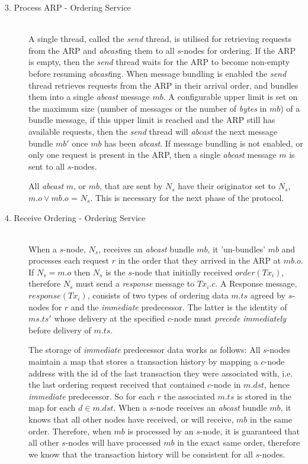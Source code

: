 \begin{description}
		\item[3. Process ARP - Ordering Service] \hfill \\
		A single thread, called the \emph{send} thread, is utilised for retrieving requests from the ARP and \emph{abcast}ing them to all $s$-nodes for ordering.  If the ARP is empty, then the \emph{send} thread waits for the ARP to become non-empty before resuming \emph{abcast}ing.  When message bundling is enabled the \emph{send} thread retrieves requests from the ARP in their arrival order, and bundles them into a single \emph{abcast} message $mb$.  A configurable upper limit is set on the maximum size (number of messages or the number of \emph{bytes} in $mb$) of a bundle message, if this upper limit is reached and the ARP still has available requests, then the \emph{send} thread will \emph{abcast} the next message bundle $mb'$ once $mb$ has been \emph{abcast}.  If message bundling is not enabled, or only one request is present in the ARP, then a single \emph{abcast} message $m$ is sent to all $s$-nodes.  
		
		All \emph{abcast} $m$, or $mb$, that are sent by  $N_s$ have their originator set to $N_s$, $m.o \lor mb.o$ = $N_s$.  This is necessary for the next phase of the protocol.  
		
		\item[4. Receive Ordering - Ordering Service] \hfill \\
		When a $s$-node, $N_s$, receives an \emph{abcast} bundle $mb$, it 'un-bundles' $mb$ and processes each request $r$ in the order that they arrived in the ARP at $mb.o$.  If $N_s = m.o$ then $N_s$ is the $s$-node that initially received $order(Tx_i)$, therefore $N_s$ must send a \emph{response} message to $Tx_i.c$.   A Response message, $response(Tx_i)$, consists of two types of ordering data $m.ts$ agreed by $s$-nodes for $r$ and the \emph{immediate} predecessor.  The latter is the identity of $ms.ts'$ whose delivery at the specified $c$-node must \emph{precede} \emph{immediately} before delivery of $m.ts$.  
		
		The storage of \emph{immediate} predecessor data works as follows: All $s$-nodes maintain a map that stores a transaction history by mapping a $c$-node address with the id of the last transaction they were associated with, i.e. the last ordering request received that contained $c$-node in $m.dst$, hence \emph{immediate} predecessor.  So for each $r$ the associated $m.ts$ is stored in the map for each $d \in m.dst$. When a $s$-node receives an \emph{abcast} bundle $mb$, it knows that all other nodes have received, or will receive, $mb$ in the same order.  Therefore, when $mb$ is processed by an $s$-node, it is guaranteed that all other $s$-nodes will have processed $mb$ in the exact same order, therefore we know that the transaction history will be consistent for all $s$-nodes.  
		

\end{description}
